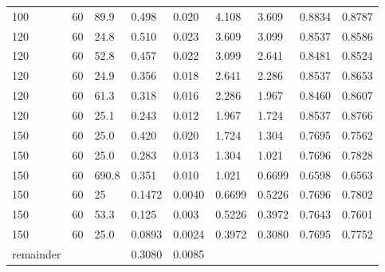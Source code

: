 \begin{small}
\begin{supertabular}{p{1.5cm}p{1.1cm}p{1.1cm}p{1.3cm}p{1.5cm}p{1.3cm}p{1.3cm}p{1.5cm}p{1.5cm}}
100 & 60 & 89.9 & 0.498 & 0.020 & 4.108 & 3.609 & 0.8834 & 0.8787 \\
120 & 60 & 24.8 & 0.510 & 0.023 & 3.609 & 3.099 & 0.8537 & 0.8586 \\
120 & 60 & 52.8 & 0.457 & 0.022 & 3.099 & 2.641 & 0.8481 & 0.8524 \\
120 & 60 & 24.9 & 0.356 & 0.018 & 2.641 & 2.286 & 0.8537 & 0.8653 \\
120 & 60 & 61.3 & 0.318 & 0.016 & 2.286 & 1.967 & 0.8460 & 0.8607 \\
120 & 60 & 25.1 & 0.243 & 0.012 & 1.967 & 1.724 & 0.8537 & 0.8766 \\
150 & 60 & 25.0 & 0.420 & 0.020 & 1.724 & 1.304 & 0.7695 & 0.7562 \\
150 & 60 & 25.0 & 0.283 & 0.013 & 1.304 & 1.021 & 0.7696 & 0.7828 \\
150 & 60 & 690.8 & 0.351 & 0.010 & 1.021 & 0.6699 & 0.6598 & 0.6563 \\
150 & 60 & 25 & 0.1472 & 0.0040 & 0.6699 & 0.5226 & 0.7696 & 0.7802 \\
150 & 60 & 53.3 & 0.125 & 0.003 & 0.5226 & 0.3972 & 0.7643 & 0.7601 \\
150 & 60 & 25.0 & 0.0893 & 0.0024 & 0.3972 & 0.3080 & 0.7695 & 0.7752 \\
remainder &  &  & 0.3080 & 0.0085 &  &  &  &  \\
\end{supertabular}
\end{small}

\clearpage

